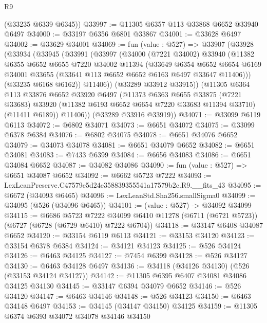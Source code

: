 \begin{lexlean}{R9}
\begin{coremodule}
      (@33235 @6339 @6345))
@33997 := @11305 @6357 @113 @33868 @6652 @33940 @6497
@34000 := @33197 @6356 @6801 @33867
@34001 := @33628 @6497
@34002 := @33629 @34001
@34069 := fun (value : @527) =>
  @33907
    (@33928
      (@33934
        (@33945
          (@33991
            (@33997
              (@34000
                (@7221 @34002)
                @33940
                (@11382
                  @6355
                  @6652
                  @6655
                  @7220
                  @34002
                  @11394
                  (@33649
                    @6354
                    @6652
                    @6654
                    @6169
                    @34001
                    @33655
                    (@33641 @113 @6652 @6652 @6163 @6497 @33647 @11406)))
                (@33235 @6168 @6162))
              @11406))
          (@33289 @33912 @33915))
        (@11305
          @6364
          @113
          @33876
          @6652
          @33920
          @6497
          (@11373
            @6363
            @6655
            @33875
            (@7221 @33683)
            @33920
            (@11382 @6193 @6652 @6654 @7220 @33683 @11394 @33710)
            (@11411 @6189))
          @11406))
      (@33289 @33916 @33919))
@34071 := @33099 @6119 @6113
@34072 := @6802 @34071
@34073 := @6651 @34072
@34075 := @33099 @6378 @6384
@34076 := @6802 @34075
@34078 := @6651 @34076 @6652
@34079 := @34073 @34078
@34081 := @6651 @34079 @6652
@34082 := @6651 @34081
@34083 := @7433 @6399
@34084 := @6656 @34083
@34086 := @6651 @34084 @6652
@34087 := @34082 @34086
@34090 := fun (value : @527) => @6651 @34087 @6652
@34092 := @6662 @5723 @7222
@34093 := LexLeanPreserve.C47579e5d24e358839355541a17579b2c.R9.__fits_43
@34095 := @6672 (@34093 @6465)
@34096 := LexLeanStd.Sha256.smallSigma0
@34099 := @34095 (@526 (@34096 @6465))
@34101 := (value : @527) -> @34092 @34099
@34115 := @6686
    @5723
    @7222
    @34099
    @6410
    @11278
    (@6711 (@6721 @5723))
    (@6727 (@6728 (@6729 @6410) @7222 @6704))
@34118 := @33147 @6408 @34087 @6652
@34120 := @33154 @6119 @6113
@34121 := @33153 @34120
@34123 := @33154 @6378 @6384
@34124 := @34121 @34123
@34125 := @526 @34124
@34126 := @6463 @34125
@34127 := @7454 @6399
@34128 := @526 @34127
@34130 := @6463 @34128 @6497
@34136 := @34118 (@34126 @34130) (@526 (@33153 @34124 @34127))
@34142 := @11305 @6395 @6407 @34081 @34086 @34125 @34130
@34145 := @33147 @6394 @34079 @6652
@34146 := @526 @34120
@34147 := @6463 @34146
@34148 := @526 @34123
@34150 := @6463 @34148 @6497
@34153 := @34145 (@34147 @34150) @34125
@34159 := @11305 @6374 @6393 @34072 @34078 @34146 @34150

\end{coremodule}
\end{lexlean}
